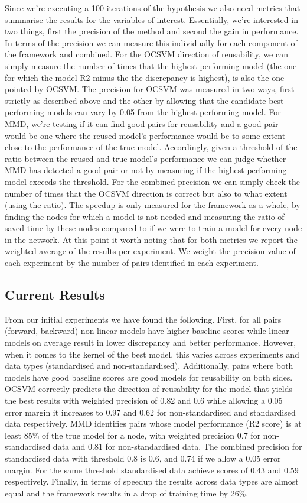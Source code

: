 \documentclass{mprop}
\begin{document}
Since we're executing a 100 iterations of the hypothesis we also need metrics that summarise the results for the variables of interest. Essentially, we're interested in two things, first the precision of the method and second the gain in performance. In terms of the precision we can measure this individually for each component of the framework and combined. For the OCSVM direction of reusability, we can simply measure the number of times that the highest performing model (the one for which the model R2 minus the the discrepancy is highest), is also the one pointed by OCSVM. The precision for OCSVM was measured in two ways, first strictly as described above and the other by allowing that the candidate best performing models can vary by 0.05 from the highest performing model. For MMD, we're testing if it can find good pairs for reusability and a good pair would be one where the reused model's performance would be to some extent close to the performance of the true model. Accordingly, given a threshold of the ratio between the reused and true model's performance we can judge whether MMD has detected a good pair or not by measuring if the highest performing model exceeds the threshold. For the combined precision we can simply check the number of times that the OCSVM direction is correct but also to what extent (using the ratio). The speedup is only measured for the framework as a whole, by finding the nodes for which a model is not needed and measuring the ratio of saved time by these nodes compared to if we were to train a model for every node in the network. At this point it worth noting that for both metrics we report the weighted average of the results per experiment. We weight the precision value of each experiment by the number of pairs identified in each experiment. 

\subsection{Current Results}\label{section:CR}

From our initial experiments we have found the following. First, for all pairs (forward, backward) non-linear models have higher baseline scores while linear models on average result in lower discrepancy and better performance. However, when it comes to the kernel of the best model, this varies across experiments and data types (standardised and non-standardised). Additionally, pairs where both models have good baseline scores are good models for reusability on both sides. OCSVM correctly predicts the direction of reusability for the model that yields the best results with weighted precision of 0.82 and 0.6 while allowing a 0.05 error margin it increases to 0.97 and 0.62 for non-standardised and standardised data respectively. MMD identifies pairs whose model performance (R2 score) is at least 85\% of the true model for a node, with weighted precision 0.7 for non-standardised data and 0.81 for non-standardised data. The combined precision for standardised data with threshold 0.8 is 0.6, and 0.74 if we allow a 0.05 error margin. For the same threshold standardised data achieve scores of 0.43 and 0.59 respectively. Finally, in terms of speedup the results across data types are almost equal and the framework results in a drop of training time by 26\%.
\end{document}
